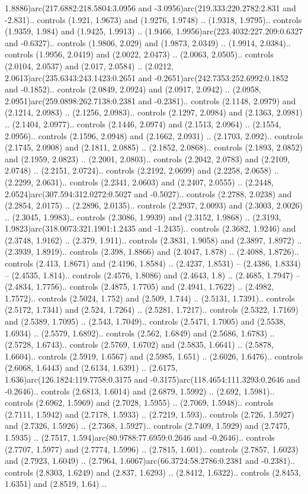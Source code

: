 1.8886)arc(217.6882:218.5804:3.0956 and -3.0956)arc(219.333:220.2782:2.831 and -2.831).. controls (1.921, 1.9673) and (1.9276, 1.9748) .. (1.9318, 1.9795).. controls (1.9359, 1.984) and (1.9425, 1.9913) .. (1.9466, 1.9956)arc(223.4032:227.209:0.6327 and -0.6327).. controls (1.9806, 2.029) and (1.9873, 2.0349) .. (1.9914, 2.0384).. controls (1.9956, 2.0419) and (2.0022, 2.0473) .. (2.0063, 2.0505).. controls (2.0104, 2.0537) and (2.017, 2.0584) .. (2.0212, 2.0613)arc(235.6343:243.1423:0.2651 and -0.2651)arc(242.7353:252.6992:0.1852 and -0.1852).. controls (2.0849, 2.0924) and (2.0917, 2.0942) .. (2.0958, 2.0951)arc(259.0898:262.7138:0.2381 and -0.2381).. controls (2.1148, 2.0979) and (2.1214, 2.0983) .. (2.1256, 2.0983).. controls (2.1297, 2.0984) and (2.1363, 2.0981) .. (2.1404, 2.0977).. controls (2.1446, 2.0974) and (2.1513, 2.0964) .. (2.1554, 2.0956).. controls (2.1596, 2.0948) and (2.1662, 2.0931) .. (2.1703, 2.092).. controls (2.1745, 2.0908) and (2.1811, 2.0885) .. (2.1852, 2.0868).. controls (2.1893, 2.0852) and (2.1959, 2.0823) .. (2.2001, 2.0803).. controls (2.2042, 2.0783) and (2.2109, 2.0748) .. (2.2151, 2.0724).. controls (2.2192, 2.0699) and (2.2258, 2.0658) .. (2.2299, 2.0631).. controls (2.2341, 2.0603) and (2.2407, 2.0555) .. (2.2448, 2.0524)arc(307.594:312.0272:0.5027 and -0.5027).. controls (2.2788, 2.0238) and (2.2854, 2.0175) .. (2.2896, 2.0135).. controls (2.2937, 2.0093) and (2.3003, 2.0026) .. (2.3045, 1.9983).. controls (2.3086, 1.9939) and (2.3152, 1.9868) .. (2.3193, 1.9823)arc(318.0073:321.1901:1.2435 and -1.2435).. controls (2.3682, 1.9246) and (2.3748, 1.9162) .. (2.379, 1.911).. controls (2.3831, 1.9058) and (2.3897, 1.8972) .. (2.3939, 1.8919).. controls (2.398, 1.8866) and (2.4047, 1.878) .. (2.4088, 1.8726).. controls (2.413, 1.8671) and (2.4196, 1.8584) .. (2.4237, 1.8531) -- (2.4386, 1.8334) -- (2.4535, 1.814).. controls (2.4576, 1.8086) and (2.4643, 1.8) .. (2.4685, 1.7947) -- (2.4834, 1.7756).. controls (2.4875, 1.7705) and (2.4941, 1.7622) .. (2.4982, 1.7572).. controls (2.5024, 1.752) and (2.509, 1.744) .. (2.5131, 1.7391).. controls (2.5172, 1.7341) and (2.524, 1.7264) .. (2.5281, 1.7217).. controls (2.5322, 1.7169) and (2.5389, 1.7095) .. (2.543, 1.7049).. controls (2.5471, 1.7005) and (2.5538, 1.6934) .. (2.5579, 1.6892).. controls (2.562, 1.6849) and (2.5686, 1.6783) .. (2.5728, 1.6743).. controls (2.5769, 1.6702) and (2.5835, 1.6641) .. (2.5878, 1.6604).. controls (2.5919, 1.6567) and (2.5985, 1.651) .. (2.6026, 1.6476).. controls (2.6068, 1.6443) and (2.6134, 1.6391) .. (2.6175, 1.636)arc(126.1824:119.7758:0.3175 and -0.3175)arc(118.4654:111.3293:0.2646 and -0.2646).. controls (2.6813, 1.6014) and (2.6879, 1.5992) .. (2.692, 1.5981).. controls (2.6962, 1.5969) and (2.7028, 1.5955) .. (2.7069, 1.5948).. controls (2.7111, 1.5942) and (2.7178, 1.5933) .. (2.7219, 1.593).. controls (2.726, 1.5927) and (2.7326, 1.5926) .. (2.7368, 1.5927).. controls (2.7409, 1.5929) and (2.7475, 1.5935) .. (2.7517, 1.594)arc(80.9788:77.6959:0.2646 and -0.2646).. controls (2.7707, 1.5977) and (2.7774, 1.5996) .. (2.7815, 1.601).. controls (2.7857, 1.6023) and (2.7923, 1.6049) .. (2.7964, 1.6067)arc(66.3724:58.2786:0.2381 and -0.2381).. controls (2.8303, 1.6249) and (2.837, 1.6293) .. (2.8412, 1.6322).. controls (2.8453, 1.6351) and (2.8519, 1.64) .. 
